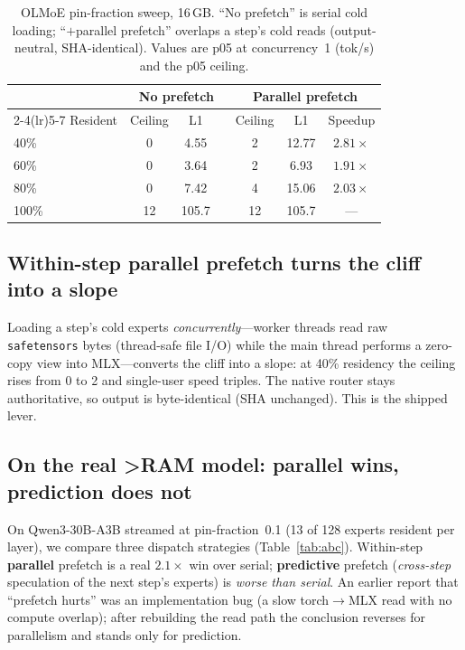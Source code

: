\documentclass[11pt]{article}
\newcommand{\ppl}{\ensuremath{\times}}
\begin{document}
\begin{table}[t]
\centering
\caption{OLMoE pin-fraction sweep, 16\,GB. ``No prefetch'' is serial cold loading;
``$+$parallel prefetch'' overlaps a step's cold reads (output-neutral, SHA-identical).
Values are p05 at concurrency~1 (tok/s) and the p05 ceiling.}
\label{tab:cliff}
\small
\begin{tabular}{lcccccc}
\toprule
& \multicolumn{3}{c}{No prefetch} & \multicolumn{3}{c}{Parallel prefetch} \\
\cmidrule(lr){2-4}\cmidrule(lr){5-7}
Resident & Ceiling & L1 & & Ceiling & L1 & Speedup \\
\midrule
40\% & 0  & 4.55  & & 2 & 12.77 & $2.81\ppl$ \\
60\% & 0  & 3.64  & & 2 & 6.93  & $1.91\ppl$ \\
80\% & 0  & 7.42  & & 4 & 15.06 & $2.03\ppl$ \\
100\%& 12 & 105.7 & & 12 & 105.7 & --- \\
\bottomrule
\end{tabular}
\end{table}

\subsection{Within-step parallel prefetch turns the cliff into a slope}
Loading a step's cold experts \emph{concurrently}---worker threads read raw
\texttt{safetensors} bytes (thread-safe file I/O) while the main thread performs a
zero-copy view into MLX---converts the cliff into a slope: at 40\% residency the ceiling
rises from 0 to 2 and single-user speed triples. The native router stays authoritative,
so output is byte-identical (SHA unchanged). This is the shipped lever.

\subsection{On the real >RAM model: parallel wins, prediction does not}
\label{sec:abc}
On Qwen3-30B-A3B streamed at pin-fraction~0.1 (13 of 128 experts resident per layer), we
compare three dispatch strategies (Table~\ref{tab:abc}). Within-step \textbf{parallel}
prefetch is a real $2.1\ppl$ win over serial; \textbf{predictive} prefetch
(\emph{cross-step} speculation of the next step's experts) is \emph{worse than serial}.
An earlier report that ``prefetch hurts'' was an implementation bug (a slow
torch$\rightarrow$MLX read with no compute overlap); after rebuilding the read path the
conclusion reverses for parallelism and stands only for prediction.
\end{document}
